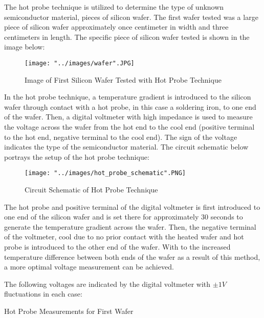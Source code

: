 The hot probe technique is utilized to determine the type of unknown semiconductor material, pieces of silicon wafer. The first wafer tested was a large piece of silicon wafer approximately once centimeter in width and three centimeters in length. The specific piece of silicon wafer tested is shown in the image below:

\begin{figure}[h!]
	\centering
	\texttt{[image: "../images/wafer".JPG]}
	\caption{Image of First Silicon Wafer Tested with Hot Probe Technique}
	\label{fig:wafer}
\end{figure}

In the hot probe technique, a temperature gradient is introduced to the silicon wafer through contact with a hot probe, in this case a soldering iron, to one end of the wafer. Then, a digital voltmeter with high impedance is used to measure the voltage across the wafer from the hot end to the cool end (positive terminal to the hot end, negative terminal to the cool end). The sign of the voltage indicates the type of the semiconductor material. The circuit schematic below portrays the setup of the hot probe technique:

\begin{figure}[h!]
	\centering
	\texttt{[image: "../images/hot\_probe\_schematic".PNG]}
	\caption{Circuit Schematic of Hot Probe Technique}
	\label{fig:hot_probe_schematic}
\end{figure}

The hot probe and positive terminal of the digital voltmeter is first introduced to one end of the silicon wafer and is set there for approximately 30 seconds to generate the temperature gradient across the wafer. Then, the negative terminal of the voltmeter, cool due to no prior contact with the heated wafer and hot probe is introduced to the other end of the wafer. With to the increased temperature difference between both ends of the wafer as a result of this method, a more optimal voltage measurement can be achieved.

The following voltages are indicated by the digital voltmeter with $\pm 1 V$ fluctuations in each case:

\begin{table}[h!]
	\centering
	\caption{Hot Probe Measurements for First Wafer}
	\label{tab:hot_probe_measurements_p_type}
\end{table}

